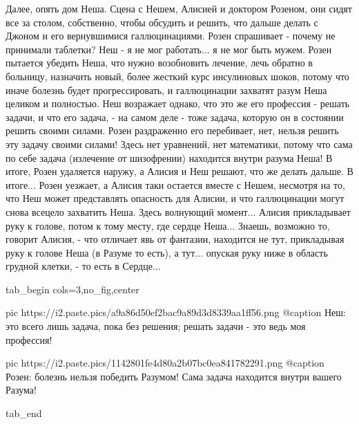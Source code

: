 Далее, опять дом Неша. Сцена с Нешем, Алисией и доктором Розеном, они сидят все
за столом, собственно, чтобы обсудить и решить, что дальше делать с Джоном и
его вернувшимися галлюцинациями. Розен спрашивает - почему не принимали
таблетки? Неш - я не мог работать...  я не мог быть мужем. Розен пытается
убедить Неша, что нужно возобновить лечение, лечь обратно в больницу, назначить
новый, более жесткий курс инсулиновых шоков, потому что иначе болезнь будет
прогрессировать, и галлюцинации захватят разум Неша целиком и полностью. Неш
возражает однако, что это же его профессия - решать задачи, и что его задача, -
на самом деле - тоже задача, которую он в состоянии решить своими силами. Розен
раздраженно его перебивает, нет, нельзя решить эту задачу своими силами! Здесь
нет уравнений, нет математики, потому что сама по себе задача (излечение от
шизофрении) находится внутри разума Неша!  В итоге, Розен удаляется наружу, а
Алисия и Неш решают, что же делать дальше. В итоге... Розен уезжает, а Алисия
таки остается вместе с Нешем, несмотря на то, что Неш может представлять
опасность для Алисии, и что галлюцинации могут снова всецело захватить Неша.
Здесь волнующий момент... Алисия прикладывает руку к голове, потом к тому
месту, где сердце Неша... Знаешь, возможно то, говорит Алисия, - что отличает
явь от фантазии, находится не тут, прикладывая руку к голове Неша (в Разуме то
есть), а тут... опуская руку ниже в область грудной клетки, - то есть в
Сердце... 

\ifcmt
  tab_begin cols=3,no_fig,center

     pic https://i2.paste.pics/a9a86d50ef2bac9a89d3d8339aa1ff56.png
		 @caption Неш: это всего лишь задача, пока без решения; решать задачи - это ведь моя профессия!

		 pic https://i2.paste.pics/1142801fe4d80a2b07bc0ea841782291.png
		 @caption Розен: болезнь нельзя победить Разумом! Сама задача находится внутри вашего Разума!

  tab_end
\fi



